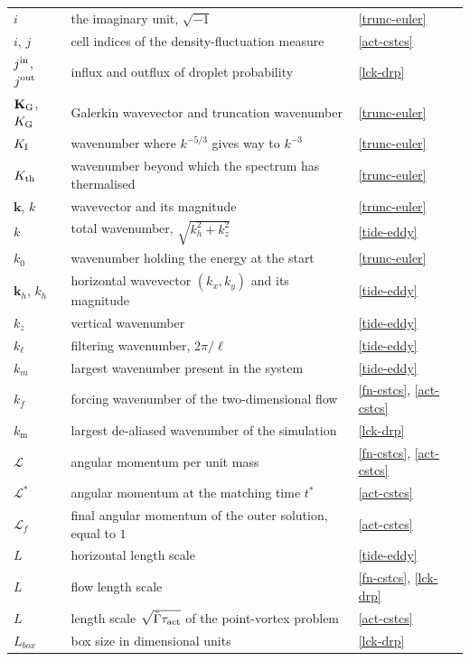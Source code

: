 \begin{longtable}{@{}p{}p{}p{}@{}}
$i$ & the imaginary unit, $\sqrt{-1}$ & \ref{trunc-euler} \\
$i$, $j$ & cell indices of the density-fluctuation measure & \ref{act-cstcs} \\
\addlinespace
$j^{\rm in}$, $j^{\rm out}$ & influx and outflux of droplet probability & \ref{lck-drp} \\
\addlinespace
$\mathbf{K}_{\rm G}$, $K_{\rm G}$ & Galerkin wavevector and truncation wavenumber & \ref{trunc-euler} \\
$K_{\rm I}$ & wavenumber where $k^{-5/3}$ gives way to $k^{-3}$ & \ref{trunc-euler} \\
$K_{\rm th}$ & wavenumber beyond which the spectrum has thermalised & \ref{trunc-euler} \\
$\mathbf{k}$, $k$ & wavevector and its magnitude & \ref{trunc-euler} \\
$k$ & total wavenumber, $\sqrt{k_h^2+k_z^2}$ & \ref{tide-eddy} \\
$k_0$ & wavenumber holding the energy at the start & \ref{trunc-euler} \\
$\boldsymbol{k}_h$, $k_h$ & horizontal wavevector $(k_x,k_y)$ and its magnitude & \ref{tide-eddy} \\
$k_z$ & vertical wavenumber & \ref{tide-eddy} \\
$k_\ell$ & filtering wavenumber, $2\pi/\ell$ & \ref{tide-eddy} \\
$k_m$ & largest wavenumber present in the system & \ref{tide-eddy} \\
$k_f$ & forcing wavenumber of the two-dimensional flow & \ref{fn-cstcs}, \ref{act-cstcs} \\
$k_{\mathrm{m}}$ & largest de-aliased wavenumber of the simulation & \ref{lck-drp} \\
\addlinespace
$\mathscr{L}$ & angular momentum per unit mass & \ref{fn-cstcs}, \ref{act-cstcs} \\
$\mathscr{L}^*$ & angular momentum at the matching time $t^*$ & \ref{act-cstcs} \\
$\mathscr{L}_f$ & final angular momentum of the outer solution, equal to $1$ & \ref{act-cstcs} \\
$L$ & horizontal length scale & \ref{tide-eddy} \\
$L$ & flow length scale & \ref{fn-cstcs}, \ref{lck-drp} \\
$L$ & length scale $\sqrt{\tilde{\Gamma}\tau_{\rm act}}$ of the point-vortex problem & \ref{act-cstcs} \\
$L_{box}$ & box size in dimensional units & \ref{lck-drp} \\

\end{longtable}
